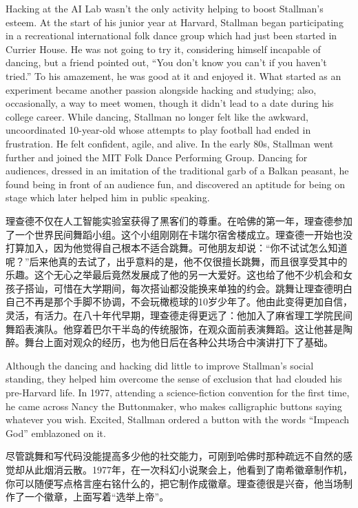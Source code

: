 \ifdefined\eng
Hacking at the AI Lab wasn't the only activity helping to boost Stallman's esteem. At the start of his junior year at Harvard, Stallman began participating in a recreational international folk dance group which had just been started in Currier House. He was not going to try it, considering himself incapable of dancing, but a friend pointed out, ``You don't know you can't if you haven't tried.'' To his amazement, he was good at it and enjoyed it. What started as an experiment became another passion alongside hacking and studying; also, occasionally, a way to meet women, though it didn't lead to a date during his college career.  While dancing, Stallman no longer felt like the awkward, uncoordinated 10-year-old whose attempts to play football had ended in frustration. He felt confident, agile, and alive. In the early 80s, Stallman went further and joined the MIT Folk Dance Performing Group.   Dancing for audiences, dressed in an imitation of the traditional garb of a Balkan peasant, he found being in front of an audience fun, and discovered an aptitude for being on stage which later helped him in public speaking.
\fi

\ifdefined\chs
理查德不仅在人工智能实验室获得了黑客们的尊重。在哈佛的第一年，理查德参加了一个世界民间舞蹈小组。这个小组刚刚在卡瑞尔宿舍楼成立。理查德一开始也没打算加入，因为他觉得自己根本不适合跳舞。可他朋友却说：``你不试试怎么知道呢？''后来他真的去试了，出乎意料的是，他不仅很擅长跳舞，而且很享受其中的乐趣。这个无心之举最后竟然发展成了他的另一大爱好。这也给了他不少机会和女孩子搭讪，可惜在大学期间，每次搭讪都没能换来单独的约会。跳舞让理查德明白自己不再是那个手脚不协调，不会玩橄榄球的10岁少年了。他由此变得更加自信，灵活，有活力。在八十年代早期，理查德走得更远了：他加入了麻省理工学院民间舞蹈表演队。他穿着巴尔干半岛的传统服饰，在观众面前表演舞蹈。这让他甚是陶醉。舞台上面对观众的经历，也为他日后在各种公共场合中演讲打下了基础。
\fi

\ifdefined\eng
Although the dancing and hacking did little to improve Stallman's social standing, they helped him overcome the sense of exclusion that had clouded his pre-Harvard life. In 1977, attending a science-fiction convention for the first time, he came across Nancy the Buttonmaker, who makes calligraphic buttons saying whatever you wish. Excited, Stallman ordered a button with the words ``Impeach God'' emblazoned on it.
\fi

\ifdefined\chs
尽管跳舞和写代码没能提高多少他的社交能力，可刚到哈佛时那种疏远不自然的感觉却从此烟消云散。1977年，在一次科幻小说聚会上，他看到了南希徽章制作机，你可以随便写点格言座右铭什么的，把它制作成徽章。理查德很是兴奋，他当场制作了一个徽章，上面写着``选举上帝''。
\fi

